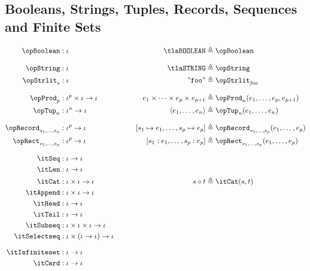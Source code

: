 \documentclass[11pt, a4paper, oneside]{article}
\begin{document}
    \subsection{Booleans, Strings, Tuples, Records, Sequences and Finite Sets}

\begin{alignat*}{4}
    \opBoolean      &: \idv                                         &\qquad \tlaBOOLEAN             &\triangleq \opBoolean \\[7pt]
    \opString       &: \idv                                         &\qquad \tlaSTRING              &\triangleq \opString \\
    \opStrlit_s     &: \idv                                         &\qquad \mkstr{foo}             &\triangleq \opStrlit_{\mathit{foo}}\\[7pt]
    \opProd_p       &: \idv^p \times \idv \arr \idv                 &\qquad e_1 \times \cdots \times e_p \times e_{p+1}  &\triangleq \opProd_n(e_1, \dots, e_p, e_{p+1}) \\
    \opTup_n        &: \idv^n \arr \idv                             &\qquad \tup{ e_1, \dots, e_n } &\triangleq \opTup_n(e_1, \dots, e_n) \\[7pt]
    \opRecord_{s_1,\dots,s_p} &: \idv^p \arr \idv                   &\qquad \bx{ s_1 \mapsto e_1, \dots, s_p \mapsto e_p }  &\triangleq \opRecord_{s_1,\dots,s_p}(e_1, \dots, e_p) \\
    \opRect_{s_1,\dots,s_p}   &: \idv^p \arr \idv                   &\qquad \bx{ s_1 : e_1, \dots, s_p : e_p }  &\triangleq \opRect_{s_1,\dots,s_p}(e_1, \dots, e_p) \\[7pt]
    \itSeq          &: \idv \arr \idv \\
    \itLen          &: \idv \arr \idv \\
    \itCat          &: \idv \times \idv \arr \idv                   &\qquad s \circ t               &\triangleq \itCat(s, t) \\
    \itAppend       &: \idv \times \idv \arr \idv \\
    \itHead         &: \idv \arr \idv \\
    \itTail         &: \idv \arr \idv \\
    \itSubseq       &: \idv \times \idv \times \idv \arr \idv \\
    \itSelectseq    &: \idv \times (\idv \arr \idv) \arr \idv \\[7pt]
    \itIsfiniteset  &: \idv \arr \idv \\
    \itCard         &: \idv \arr \idv
\end{alignat*}
\end{document}
